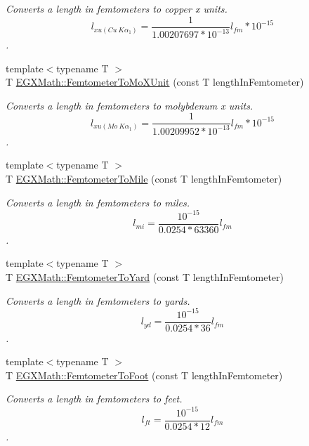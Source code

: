 \begin{DoxyCompactItemize}
\begin{DoxyCompactList}\small\item\em Converts a length in femtometers to copper x units. \[ l_{xu(Cu\ K\alpha_1)}= \frac{1}{1.00207697*10^{-13}} l_{fm} * 10^{-15}\]. \end{DoxyCompactList}\item 
{\footnotesize template$<$typename T $>$ }\\T \mbox{\hyperlink{group___e_g_x_math-_conversions-_length_conversions-_s_i-_femtometer-_non-_s_i_ga57801d7c681362c1a11053233e31c415}{E\+G\+X\+Math\+::\+Femtometer\+To\+Mo\+X\+Unit}} (const T length\+In\+Femtometer)
\begin{DoxyCompactList}\small\item\em Converts a length in femtometers to molybdenum x units. \[ l_{xu(Mo\ K\alpha_1)}=\frac{1}{1.00209952*10^{-13}} l_{fm} * 10^{-15}\]. \end{DoxyCompactList}\item 
{\footnotesize template$<$typename T $>$ }\\T \mbox{\hyperlink{group___e_g_x_math-_conversions-_length_conversions-_s_i-_femtometer-_imperial_ga8973c4ada3a3bc89034978a0ba7c2693}{E\+G\+X\+Math\+::\+Femtometer\+To\+Mile}} (const T length\+In\+Femtometer)
\begin{DoxyCompactList}\small\item\em Converts a length in femtometers to miles. \[ l_{mi}=\frac{10^{-15}}{0.0254 * 63360} l_{fm} \]. \end{DoxyCompactList}\item 
{\footnotesize template$<$typename T $>$ }\\T \mbox{\hyperlink{group___e_g_x_math-_conversions-_length_conversions-_s_i-_femtometer-_imperial_ga4416c9d0cb07df4b86f23afe6b7f6e91}{E\+G\+X\+Math\+::\+Femtometer\+To\+Yard}} (const T length\+In\+Femtometer)
\begin{DoxyCompactList}\small\item\em Converts a length in femtometers to yards. \[ l_{yd}= \frac{10^{-15}}{0.0254 * 36} l_{fm} \]. \end{DoxyCompactList}\item 
{\footnotesize template$<$typename T $>$ }\\T \mbox{\hyperlink{group___e_g_x_math-_conversions-_length_conversions-_s_i-_femtometer-_imperial_gaa33efbf3b5cee0874ad44736c0ac6fd2}{E\+G\+X\+Math\+::\+Femtometer\+To\+Foot}} (const T length\+In\+Femtometer)
\begin{DoxyCompactList}\small\item\em Converts a length in femtometers to feet. \[ l_{ft}= \frac{10^{-15}}{0.0254 * 12} l_{fm} \]. \end{DoxyCompactList}\item 

\end{DoxyCompactItemize}
